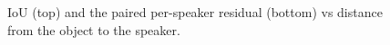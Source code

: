 \begin{figure}[t]
\centering

\caption{IoU (top) and the paired per-speaker residual (bottom) vs distance from the object to the speaker.}
\label{fig:speaker_distance}
\end{figure}
